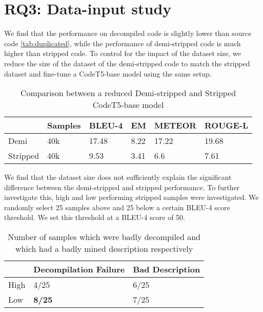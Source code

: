 
\section{RQ3: Data-input study}
We find that the performance on decompiled code is slightly lower than source code \ref{tab:duplicated}, while the performance of demi-stripped code is much higher than stripped code. To control for the impact of the dataset size, we reduce the size of the dataset of the demi-stripped code to match the stripped dataset and fine-tune a CodeT5-base model using the same setup.

\begin{table}[!h]
\centering
\begin{tabular}{llllll} 
\hline
\rowcolor[rgb]{0.729,0.729,0.729} \multicolumn{1}{|l}{\textbf{}} & Samples & BLEU-4 & EM   & METEOR & \multicolumn{1}{l|}{ROUGE-L}  \\ 
\hline
Demi                                                             & 40k     & 17.48  & 8.22 & 17.22  &  19.68                             \\
Stripped                                                         & 40k     & 9.53   & 3.41 & 6.6  &  7.61                            
\end{tabular}
\caption{Comparison between a reduced Demi-stripped and Stripped CodeT5-base model}
\label{tab:demiSize}
\end{table}

We find that the dataset size does not sufficiently explain the significant difference between the demi-stripped and stripped performance. To further investigate this, high and low performing stripped samples were investigated. We randomly select 25 samples above and 25 below a certain BLEU-4 score threshold. We set this threshold at a BLEU-4 score of 50.

\begin{table}[!h]
\centering
\begin{tabular}{lll}
\hline
\rowcolor[HTML]{C0C0C0} 
\multicolumn{1}{|l}{\cellcolor[HTML]{C0C0C0}\textbf{}} & Decompilation Failure & \multicolumn{1}{l|}{\cellcolor[HTML]{C0C0C0}Bad Description} \\ \hline
High                                                   & 4/25                     & 6/25                                                            \\
Low                                                    & \textbf{8/25}                     & 7/25                                                           
\end{tabular}
\caption{Number of samples which were badly decompiled and which had a badly mined description respectively}
\label{tab:manual}
\end{table}

